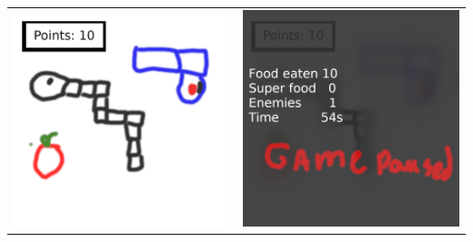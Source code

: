 \documentclass[a4paper]{paper}
\begin{document}
\begin{center}
\begin{tabular}{c c}
        \includegraphics[scale=0.5]{imgs/m3.png}&
        \includegraphics[scale=0.5]{imgs/m4.png}\\

\end{tabular}
\end{center}
\end{document}

